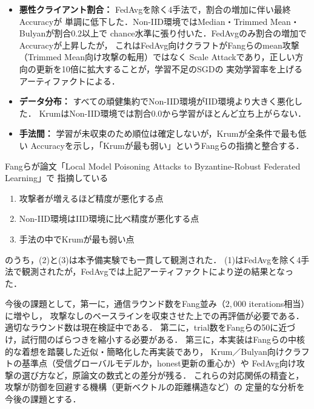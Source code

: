 \documentclass[a4j, twocolumn, dvipdfmx]{jsarticle}  %
\begin{document}
\begin{itemize}
    \item \textbf{悪性クライアント割合：} FedAvgを除く4手法で，割合の増加に伴い最終Accuracyが
          単調に低下した．Non-IID環境ではMedian・Trimmed Mean・Bulyanが割合$0.2$以上で
          chance水準に張り付いた．FedAvgのみ割合の増加でAccuracyが上昇したが，
          これはFedAvg向けクラフトがFangらのmean攻撃（Trimmed Mean向け攻撃の転用）ではなく
          Scale Attackであり，正しい方向の更新を10倍に拡大することが，学習不足のSGDの
          実効学習率を上げるアーティファクトによる．
    \item \textbf{データ分布：} すべての頑健集約でNon-IID環境がIID環境より大きく悪化した．
          KrumはNon-IID環境では割合$0.0$から学習がほとんど立ち上がらない．
    \item \textbf{手法間：} 学習が未収束のため順位は確定しないが，Krumが全条件で最も低い
          Accuracyを示し，「Krumが最も弱い」というFangらの指摘と整合する．
\end{itemize}

Fangらが論文「Local Model Poisoning Attacks to Byzantine-Robust Federated Learning」で
指摘している

\begin{enumerate}
    \item 攻撃者が増えるほど精度が悪化する点
    \item Non-IID環境はIID環境に比べ精度が悪化する点
    \item 手法の中でKrumが最も弱い点
\end{enumerate}

のうち，(2)と(3)は本予備実験でも一貫して観測された．
(1)はFedAvgを除く4手法で観測されたが，FedAvgでは上記アーティファクトにより逆の結果となった．

今後の課題として，第一に，通信ラウンド数をFang並み（$2{,}000$ iterations相当）に増やし，
攻撃なしのベースラインを収束させた上での再評価が必要である．適切なラウンド数は現在検証中である．
第二に，trial数をFangらの50に近づけ，試行間のばらつきを縮小する必要がある．
第三に，本実装はFangらの中核的な着想を踏襲した近似・簡略化した再実装であり，
Krum／Bulyan向けクラフトの基準点（受信グローバルモデルか，honest更新の重心か）や
FedAvg向け攻撃の選び方など，原論文の数式との差分が残る．
これらの対応関係の精査と，攻撃が防御を回避する機構（更新ベクトルの距離構造など）の
定量的な分析を今後の課題とする．
\end{document}
